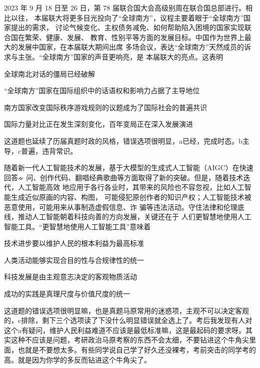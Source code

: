 \documentclass[lang=cn,newtx,10pt,scheme=chinese,pad,twocol]{zznote}
\begin{document}
\begin{exercise}2023 年 9 月 18 日至 26 日，第 78 届联合国大会高级别周在联合国总部进行。相比以往， 本届联大将更多目光投向了“全球南方”，议程主要着眼于“全球南方”国家提出的需求， 讨论气候变化、主权债务减免、如何帮助陷入困境的国家实现联合国在繁荣、健康、发展、 教育、性别平等方面的发展目标。中国作为世界上最大的发展中国家，在本届联大期间出席 多场会议，表达“全球南方”天然成员的诉求与主张。“全球南方”国家的声音更响亮，是 本届联大的亮点。这表明
	\begin{choice}
		\item 全球南北对话的僵局已经破解
		\item “全球南方”国家在国际组织中的话语权和影响力占据了主导地位
		\item 南方国家改变国际秩序游戏规则的议题成为了国际社会的普遍共识
		\item 国际力量对比正在发生深刻变化，百年变局正在深入发展演进
	\end{choice}
\end{exercise}
\begin{solution}
	这道题也延续了历届真题时政的风格，错误选项很明显，a已经，完成时态。b主导，c普遍，违背常识。
\end{solution}


\begin{exercise}随着新一代人工智能技术的发展，基于大模型的生成式人工智能（AIGC）在快速回答ᨀ 问、创作代码、翻唱经典歌曲等方面取得了新的突破。但是，随着技术迭代，人工智能高效 地应用于各行各业时，其带来的风险也不容忽视，比如人工智能生成近似原画的内容、构图， 可能侵犯原创作者的知识产权；人工智能技术被恶意使用，可能用来从事制造虚假信息、诈 骗等违法活动。守住法律和伦理底线，推动人工智能朝着科技向善的方向发展，关键还在于 人们更智慧地使用人工智能工具。“更智慧地使用人工智能工具”意味着
	\begin{choice}
		\item 技术进步要以维护人民的根本利益为最高标准
		\item 人类活动能够实现合目的性与合规律性的统一
		\item 科技发展是由主观意志决定的客观物质活动
		\item 成功的实践是真理尺度与价值尺度的统一
	\end{choice}
\end{exercise}
\begin{solution}
	​这道题的错误选项很明显嘛，也是真题马原常用的迷惑项，主观不可以决定客观的，c排除，剩下三个选项读了下没什么明显错误就全选上了。考后我发现有人对这个a有疑问，维护人民利益难道不应该是最低标准嘛，这是最起码的要求呀。其实这种不应该是问题，考研政治马原考察的东西不会太细，不要钻进这个牛角尖里面，也就是不要想太多。有些同学说自己学了好久还没裸考，考前突击的同学考的高。就是因为你学的多反而钻进这个牛角尖了。
\end{solution}
\end{document}
